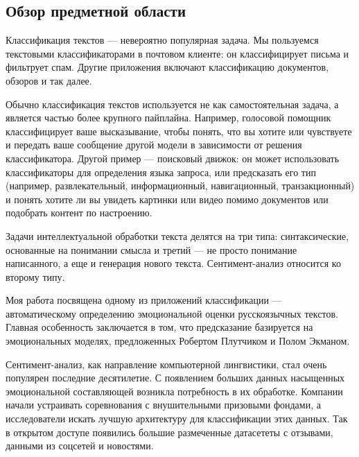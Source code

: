 \subsection{Обзор предметной области}


\par
Классификация текстов --- невероятно популярная задача. Мы пользуемся текстовыми классификаторами в почтовом клиенте: он классифицирует письма и фильтрует спам. Другие приложения включают классификацию документов, обзоров и так далее.

\bigskip\par
Обычно классификация текстов используется не как самостоятельная задача, а является частью более крупного пайплайна. Например, голосовой помощник классифицирует ваше высказывание, чтобы понять, что вы хотите или чувствуете и передать ваше сообщение другой модели в зависимости от решения классификатора.  Другой пример --- поисковый движок: он может использовать классификаторы для определения языка запроса, или предсказать его тип (например, развлекательный, информационный, навигационный, транзакционный) и понять хотите ли вы увидеть картинки или видео помимо документов или подобрать контент по настроению.

\bigskip
Задачи интеллектуальной обработки текста делятся на три типа: синтаксические, основанные на понимании смысла и третий --- не просто понимание написанного, а еще и генерация нового текста. Сентимент-анализ относится ко второму типу.
\bigskip\par
Моя работа посвящена одному из приложений классификации --- автоматическому определению эмоциональной оценки русскоязычных текстов. Главная особенность  заключается в том, что предсказание базируется на эмоциональных моделях, предложенных Робертом Плутчиком и Полом Экманом.

\bigskip\par
Сентимент-анализ, как направление компьютерной лингвистики, стал очень популярен последние десятилетие. С
появлением больших данных насыщенных эмоциональной составляющей возникла потребность в их обработке. Компании
начали устраивать соревнования с внушительными призовыми фондами, а исследователи искать лучшую архитектуру
для классификации этих данных. Так в открытом доступе появились большие размеченные датасететы с отзывами,
данными из соцсетей и новостями.

